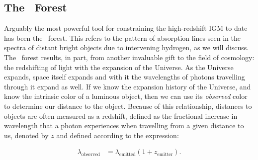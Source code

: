 \subsection{The \lya\ Forest}\label{sec:LyaForest}
Arguably the most powerful tool for constraining the high-redshift IGM to date has been the \lya\ forest. This refers to the pattern of absorption lines seen in the spectra of distant bright objects due to intervening hydrogen, as we will discuss. The \lya\ forest results, in part, from another invaluable gift to the field of cosmology: the redshifting of light with the expansion of the Universe. As the Universe expands, space itself expands and with it the wavelengths of photons travelling through it expand as well. If we know the expansion history of the Universe, and know the intrinsic color of a luminous object, then we can use its \textit{observed} color to determine our distance to the object. Because of this relationship, distances to objects are often measured as a redshift, defined as the fractional increase in wavelength that a photon experiences when travelling from a given distance to us, denoted by $z$ and defined according to the expression: 

\begin{align}
\lambda_{\text{observed}} &= \lambda_{\text{emitted}}(1+z_{\text{emitter}}). 
\end{align}

